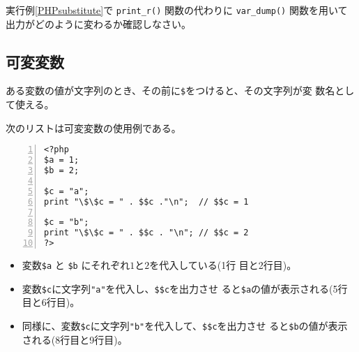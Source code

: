  \begin{Prob}\upshape
  実行例\ref{PHPsubstitute}で \Verb+print_r()+ 関数の代わりに
   \Verb+var_dump()+ 関数を用いて出力がどのように変わるか確認しなさい。
 \end{Prob}
 \subsection{可変変数}
 ある変数の値が文字列のとき、その前に\Verb+$+をつけると、その文字列が変
 数名として使える。
 \begin{Exec}\upshape
  次のリストは可変変数の使用例である。
\begin{Verbatim}[numbers=left]
<?php
$a = 1;
$b = 2;

$c = "a";
print "\$\$c = " . $$c ."\n";  // $$c = 1

$c = "b";
print "\$\$c = " . $$c . "\n"; // $$c = 2
?>
\end{Verbatim}
  \begin{itemize}\upshape
   \item 変数\Verb+$a+ と \Verb+$b+ にそれぞれ$1$と$2$を代入している(1行
         目と2行目)。
   \item 変数\Verb+$c+に文字列\Verb+"a"+を代入し、\Verb+$$c+を出力させ
         ると\Verb+$a+の値が表示される(5行目と6行目)。
   \item 同様に、変数\Verb+$c+に文字列\Verb+"b"+を代入して、\Verb+$$c+を出力させ
         ると\Verb+$b+の値が表示される(8行目と9行目)。
  \end{itemize}
\end{Exec}
